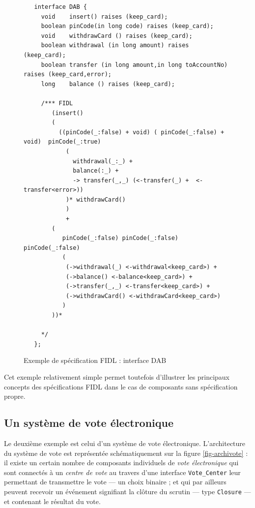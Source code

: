 \begin{figure}[htbp]
    \centering
\begin{lstlisting}
   interface DAB {
     void    insert() raises (keep_card);
     boolean pinCode(in long code) raises (keep_card);
     void    withdrawCard () raises (keep_card);
     boolean withdrawal (in long amount) raises (keep_card);
     boolean transfer (in long amount,in long toAccountNo) raises (keep_card,error);
     long    balance () raises (keep_card);
     
     /*** FIDL
        (insert()
        ( 
          ((pinCode(_:false) + void) ( pinCode(_:false) + void)  pinCode(_:true)
            (
              withdrawal(_:_) +
              balance(:_) +
              -> transfer(_,_) (<-transfer(_) +  <-transfer<error>)) 
            )* withdrawCard() 
            ) 
            +
        ( 
           pinCode(_:false) pinCode(_:false) pinCode(_:false) 
           (
            (->withdrawal(_) <-withdrawal<keep_card>) +
            (->balance() <-balance<keep_card>) +
            (->transfer(_,_) <-transfer<keep_card>) +
            (->withdrawCard() <-withdrawCard<keep_card>)
           )
        ))*
       
     */
   };
\end{lstlisting}

    \caption{Exemple de sp\'ecification \textsf{FIDL} : interface DAB}
    \label{fig-exifacedab}
\end{figure}
 
Cet exemple relativement simple permet toutefois d'illustrer les
principaux concepts des sp\'ecifications \textsf{FIDL} dans le cas de
composants sans sp\'ecification propre. 

\subsection{Un syst\`eme de vote \'electronique}

Le deuxi\`eme exemple est celui d'un syst\`eme de vote
\'electronique. L'architecture du syst\`eme de vote est
repr\'esent\'ee sch\'ematiquement sur la  figure
\ref{fig-archivote} : il existe un certain nombre de composants
individuels de \emph{vote \'electronique} qui sont connect\'es \`a un
\emph{centre de vote} au travers d'une interface \texttt{Vote\_Center}
leur permettant de transmettre le vote --- un choix binaire ; et qui
par ailleurs peuvent recevoir un \'ev\'enement signifiant la
cl\^oture du scrutin --- type \texttt{Closure} --- et contenant le
r\'esultat du vote.

